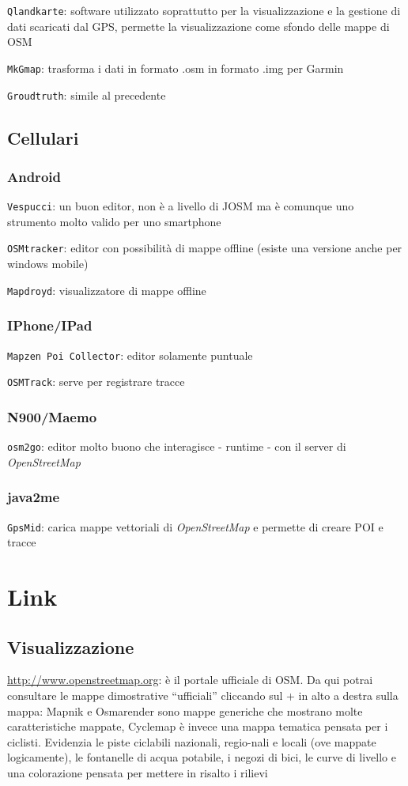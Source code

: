 \documentclass[a4paper,twoside,12pt,]{article}
\newcommand{\osm}{\emph{OpenStreetMap}\xspace}
\newcommand{\gps}{GPS\xspace}
\newcommand{\soft}[1]{\texttt{#1}}
\begin{document}
\soft{Qlandkarte}: software utilizzato soprattutto per la visualizzazione e la gestione di dati scaricati dal \gps, permette la visualizzazione come sfondo delle mappe di OSM

\soft{MkGmap}: trasforma i dati in formato .osm in formato .img per Garmin

\soft{Groudtruth}: simile al precedente

\subsection{Cellulari}
\subsubsection{Android}

\soft{Vespucci}: un buon editor, non è a livello di JOSM ma è comunque uno strumento molto valido per uno smartphone

\soft{OSMtracker}: editor con possibilità di mappe offline (esiste una versione anche per windows mobile)

\soft{Mapdroyd}: visualizzatore di mappe offline
\subsubsection{IPhone/IPad}

\soft{Mapzen Poi Collector}: editor solamente puntuale

\soft{OSMTrack}: serve per registrare tracce
\subsubsection{N900/Maemo}

\soft{osm2go}: editor molto buono che interagisce - runtime - con il server di \osm
\subsubsection{java2me}

\soft{GpsMid}: carica mappe vettoriali di \osm e permette di creare POI e tracce

\section{Link}
\subsection{Visualizzazione}
\url{http://www.openstreetmap.org}: è il portale ufficiale di OSM. Da qui potrai consultare le mappe dimostrative “ufficiali” cliccando sul + in alto a destra sulla mappa:
Mapnik e Osmarender sono mappe generiche che mostrano molte caratteristiche mappate,
Cyclemap è invece una mappa tematica pensata per i ciclisti. Evidenzia le piste ciclabili nazionali, regio-nali e locali (ove mappate logicamente), le fontanelle di acqua potabile, i negozi di bici, le curve di livello e una colorazione pensata per mettere in risalto i rilievi
\end{document}
